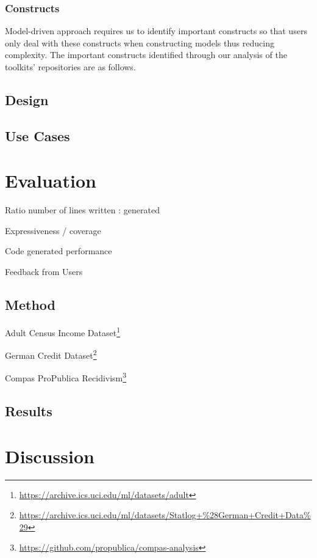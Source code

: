 \documentclass[final,5p,times,twocolumn]{elsarticle}
\begin{document}
\subsubsection{Constructs}
\label{sec:constructs}
Model-driven approach requires us to identify important constructs so that users only deal with these constructs when constructing models thus reducing complexity. The important constructs identified through our analysis of the toolkits' repositories are as follows. 


\subsection{Design}
\label{sec:design}

\subsection{Use Cases}
\label{sec:use_Cases}

\section{Evaluation}
\label{sec:evaluation}



Ratio number of lines written : generated

Expressiveness / coverage

Code generated performance

Feedback from Users


\subsection{Method}
\label{sec:method}

Adult Census Income Dataset\footnote{\url{https://archive.ics.uci.edu/ml/datasets/adult}}

German Credit Dataset\footnote{\url{https://archive.ics.uci.edu/ml/datasets/Statlog+\%28German+Credit+Data\%29}}

Compas ProPublica Recidivism\footnote{\url{https://github.com/propublica/compas-analysis}}

\subsection{Results}
\label{sec:Results}

\section{Discussion}
\label{sec:discussion}
\end{document}
